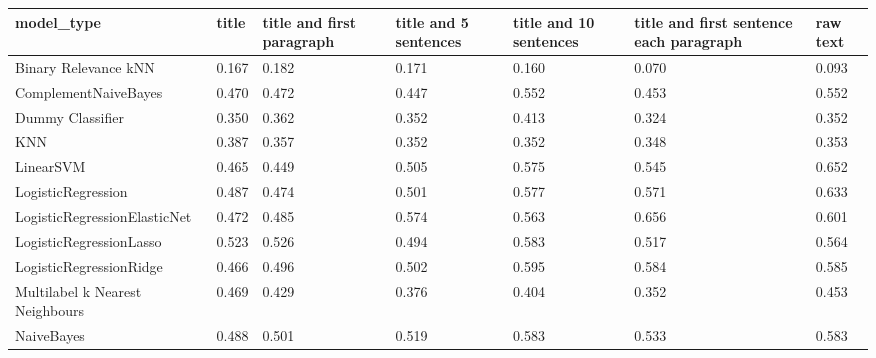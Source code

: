 \begin{tabular}{lllllll}
\toprule
                     model\_type & title & title and first paragraph & title and 5 sentences & title and 10 sentences & title and first sentence each paragraph &  raw text \\
\midrule
           Binary Relevance kNN & 0.167 &                     0.182 &                 0.171 &                  0.160 &                                   0.070 &     0.093 \\
           ComplementNaiveBayes & 0.470 &                     0.472 &                 0.447 &                  0.552 &                                   0.453 &     0.552 \\
               Dummy Classifier & 0.350 &                     0.362 &                 0.352 &                  0.413 &                                   0.324 &     0.352 \\
                            KNN & 0.387 &                     0.357 &                 0.352 &                  0.352 &                                   0.348 &     0.353 \\
                      LinearSVM & 0.465 &                     0.449 &                 0.505 &                  0.575 &                                   0.545 &     0.652 \\
             LogisticRegression & 0.487 &                     0.474 &                 0.501 &                  0.577 &                                   0.571 &     0.633 \\
   LogisticRegressionElasticNet & 0.472 &                     0.485 &                 0.574 &                  0.563 &                                   0.656 &     0.601 \\
        LogisticRegressionLasso & 0.523 &                     0.526 &                 0.494 &                  0.583 &                                   0.517 &     0.564 \\
        LogisticRegressionRidge & 0.466 &                     0.496 &                 0.502 &                  0.595 &                                   0.584 &     0.585 \\
Multilabel k Nearest Neighbours & 0.469 &                     0.429 &                 0.376 &                  0.404 &                                   0.352 &     0.453 \\
                     NaiveBayes & 0.488 &                     0.501 &                 0.519 &                  0.583 &                                   0.533 &     0.583 \\

\end{tabular}
